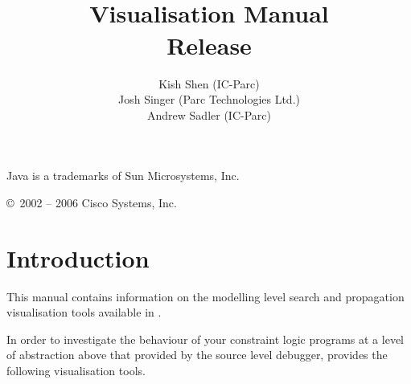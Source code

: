 \documentclass[11pt,a4paper]{book}
\title{
    {\Large\bf \eclipse}\\
    \vspace{1cm}
    {\Huge\bf Visualisation Manual}\\
    \vspace{1cm}
    Release \eclipseversion}
\author{
Kish Shen       (IC-Parc) \\
Josh Singer	(Parc Technologies Ltd.) \\
Andrew Sadler   (IC-Parc)
}
\begin{document}
\maketitle


\setcounter{page}{2}
\pagestyle{empty}

\vfill
{}

\bigskip\bigskip
Java is a trademarks of Sun Microsystems, Inc.

\copyright\ 2002 -- 2006 Cisco Systems, Inc.
\bigskip\bigskip\bigskip\bigskip\bigskip\bigskip

\cleardoublepage
\pagestyle{plain}

\begin{latexonly}
\tableofcontents
\end{latexonly}

\cleardoublepage
{}

\chapter{Introduction}
This manual contains information on the modelling level search and
propagation visualisation tools available in {\eclipse}.

In order to investigate the behaviour of your constraint logic
programs at a level of abstraction above that provided by the source
level debugger, {\eclipse} provides the following visualisation tools.




\newpage
\printindex
\end{document}
